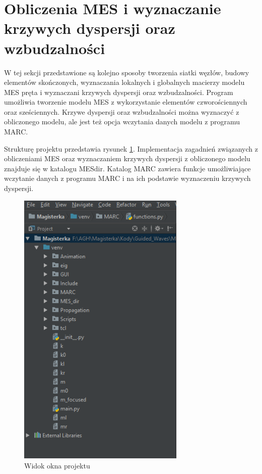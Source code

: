\section{Obliczenia MES i wyznaczanie krzywych dyspersji oraz wzbudzalności}
\label{cha:obliczenia_mes}

W tej sekcji przedstawione są kolejno sposoby tworzenia siatki węzłów, budowy elementów skończonych, wyznaczania lokalnych i globalnych macierzy modelu MES pręta i wyznaczani krzywych dyspersji oraz wzbudzalności. Program umożliwia tworzenie modelu MES z wykorzystanie elementów czworościennych oraz sześciennych. Krzywe dyspersji oraz wzbudzalności można wyznaczyć z obliczonego modelu, ale jest też opcja wczytania danych modelu z programu MARC.

Strukturę projektu przedstawia rysunek \ref{fig:okno_projektu}. Implementacja zagadnień związanych z obliczeniami MES oraz wyznaczaniem krzywych dyspersji z obliczonego modelu znajduje się w katalogu MES\textunderscore dir. Katalog MARC zawiera funkcje umożliwiające wczytanie danych z programu MARC i na ich podstawie wyznaczeniu krzywych dyspersji.

\begin{figure}[h]
\centering
\includegraphics[width=8cm]{Zdjecia/5/okno_projektu}
\caption{Widok okna projektu}
\label{fig:okno_projektu}
\end{figure}













